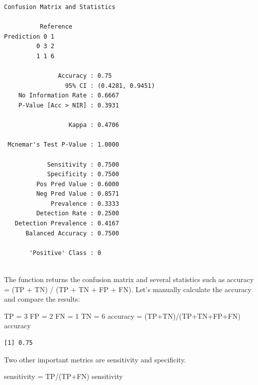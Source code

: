 \documentclass[
  letterpaper,
  DIV=11,
  numbers=noendperiod]{scrreprt}
\newenvironment{Shaded}{\begin{snugshade}}{\end{snugshade}}
\newcommand{\DecValTok}[1]{\textcolor[rgb]{0.68,0.00,0.00}{#1}}
\newcommand{\NormalTok}[1]{\textcolor[rgb]{0.00,0.23,0.31}{#1}}
\newcommand{\OtherTok}[1]{\textcolor[rgb]{0.00,0.23,0.31}{#1}}
\newcommand{\SpecialCharTok}[1]{\textcolor[rgb]{0.37,0.37,0.37}{#1}}
\begin{document}
\begin{verbatim}
Confusion Matrix and Statistics

          Reference
Prediction 0 1
         0 3 2
         1 1 6
                                          
               Accuracy : 0.75            
                 95% CI : (0.4281, 0.9451)
    No Information Rate : 0.6667          
    P-Value [Acc > NIR] : 0.3931          
                                          
                  Kappa : 0.4706          
                                          
 Mcnemar's Test P-Value : 1.0000          
                                          
            Sensitivity : 0.7500          
            Specificity : 0.7500          
         Pos Pred Value : 0.6000          
         Neg Pred Value : 0.8571          
             Prevalence : 0.3333          
         Detection Rate : 0.2500          
   Detection Prevalence : 0.4167          
      Balanced Accuracy : 0.7500          
                                          
       'Positive' Class : 0               
                                          
\end{verbatim}

The function returns the confusion matrix and several statistics such as
accuracy = (TP + TN) / (TP + TN + FP + FN). Let's manually calculate the
accuracy and compare the results:

\begin{Shaded}
\begin{Highlighting}[]
\NormalTok{TP }\OtherTok{=} \DecValTok{3}
\NormalTok{FP }\OtherTok{=} \DecValTok{2}
\NormalTok{FN }\OtherTok{=} \DecValTok{1}
\NormalTok{TN }\OtherTok{=} \DecValTok{6}
\NormalTok{accuracy }\OtherTok{=}\NormalTok{ (TP}\SpecialCharTok{+}\NormalTok{TN)}\SpecialCharTok{/}\NormalTok{(TP}\SpecialCharTok{+}\NormalTok{TN}\SpecialCharTok{+}\NormalTok{FP}\SpecialCharTok{+}\NormalTok{FN)}
\NormalTok{accuracy}
\end{Highlighting}
\end{Shaded}

\begin{verbatim}
[1] 0.75
\end{verbatim}

Two other important metrics are sensitivity and specificity.

\begin{Shaded}
\begin{Highlighting}[]
\NormalTok{sensitivity }\OtherTok{=}\NormalTok{ TP}\SpecialCharTok{/}\NormalTok{(TP}\SpecialCharTok{+}\NormalTok{FN)}
\NormalTok{sensitivity}
\end{Highlighting}
\end{Shaded}
\end{document}
